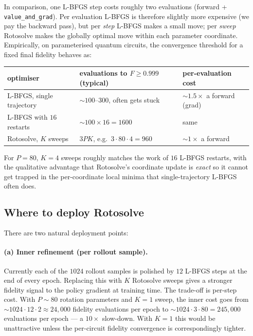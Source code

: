 \documentclass[11pt,a4paper]{article}
\begin{document}
In comparison, one L-BFGS step costs roughly two evaluations (forward +
\texttt{value\_and\_grad}). Per evaluation L-BFGS is therefore slightly
more expensive (we pay the backward pass), but per \emph{step} L-BFGS
makes a small move; per \emph{sweep} Rotosolve makes the globally optimal
move within each parameter coordinate. Empirically, on parameterised
quantum circuits, the convergence threshold for a fixed final fidelity
behaves as:
\begin{center}
\small
\begin{tabular}{lll}
\toprule
optimiser & evaluations to $F \!\ge\! 0.999$ (typical) & per-evaluation cost \\
\midrule
L-BFGS, single trajectory & $\sim 100$--$300$, often gets stuck         & $\sim 1.5\times$ a forward (grad) \\
L-BFGS with $16$ restarts & $\sim 100\times 16 = 1600$                 & same  \\
Rotosolve, $K$ sweeps     & $3 P K$, e.g.\ $3\!\cdot\! 80\!\cdot\! 4 = 960$ & $\sim 1\times$ a forward \\
\bottomrule
\end{tabular}
\end{center}
For $P = 80$, $K = 4$ sweeps roughly matches the work of $16$ L-BFGS
restarts, with the qualitative advantage that Rotosolve's coordinate
update is \emph{exact} so it cannot get trapped in the per-coordinate
local minima that single-trajectory L-BFGS often does.

\subsection{Where to deploy Rotosolve}

There are two natural deployment points:

\paragraph{(a) Inner refinement (per rollout sample).}
Currently each of the $1024$ rollout samples is polished by $12$
L-BFGS steps at the end of every epoch. Replacing this with $K$ Rotosolve
sweeps gives a stronger fidelity signal to the policy gradient at
training time. The trade-off is per-step cost. With $P \sim 80$ rotation
parameters and $K = 1$ sweep, the inner cost goes from
$\sim 1024 \cdot 12 \cdot 2 \approx 24{,}000$ fidelity evaluations per
epoch to $\sim 1024 \cdot 3 \cdot 80 = 245{,}000$ evaluations per epoch
--- a $10\!\times\!$ slow-down. With $K = 1$ this would be unattractive
unless the per-circuit fidelity convergence is correspondingly tighter.
\end{document}
